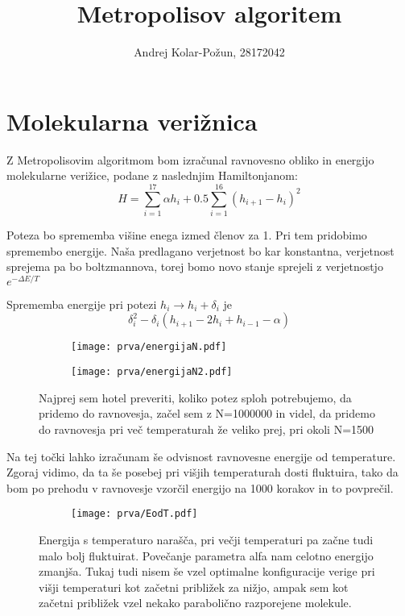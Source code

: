\documentclass{article}
\title{Metropolisov algoritem}
\author{Andrej Kolar-Požun, 28172042}
\begin{document}
\maketitle
\newpage
{}
\section{Molekularna verižnica}

Z Metropolisovim algoritmom bom izračunal ravnovesno obliko in energijo molekularne verižice, podane z naslednjim  Hamiltonjanom:
\begin{equation*}
H = \sum_{i=1}^{17}\alpha h_i + 0.5 \sum_{i=1}^{16} (h_{i+1} - h_{i})^2
\end{equation*}

Poteza bo sprememba višine enega izmed členov za 1. Pri tem pridobimo spremembo energije.
Naša predlagano verjetnost bo kar konstantna, verjetnost sprejema pa bo boltzmannova, torej bomo novo stanje sprejeli z verjetnostjo
$e^{-\Delta E/T}$

Sprememba energije pri potezi  $h_i \rightarrow h_i + \delta_i$ je
\begin{equation*}
\delta_i^2 - \delta_i (h_{i+1} - 2h_i + h_{i-1} - \alpha)
\end{equation*}

\begin{figure}[H]
\centering
\begin{subfigure}{.49\textwidth}
\texttt{[image: prva/energijaN.pdf]}
\end{subfigure}
\begin{subfigure}{.49\textwidth}
\texttt{[image: prva/energijaN2.pdf]}
\end{subfigure}
\caption*{Najprej sem hotel preveriti, koliko potez sploh potrebujemo, da pridemo do ravnovesja, začel sem z N=1000000 in videl, da pridemo do ravnovesja pri več temperaturah že veliko prej, pri okoli N=1500}
\end{figure}

Na tej točki lahko izračunam še odvisnost ravnovesne energije od temperature. Zgoraj vidimo, da ta še posebej pri višjih temperaturah dosti fluktuira, tako da bom po prehodu v ravnovesje vzorčil energijo na 1000 korakov in to povprečil.

\begin{figure}[H]
\centering
\begin{subfigure}{.7\textwidth}
\texttt{[image: prva/EodT.pdf]}
\end{subfigure}
\caption*{Energija s temperaturo narašča, pri večji temperaturi pa začne tudi malo bolj fluktuirat. Povečanje parametra alfa nam celotno energijo zmanjša. Tukaj tudi nisem še vzel optimalne konfiguracije verige pri višji temperaturi kot začetni približek za nižjo, ampak sem kot začetni približek vzel nekako parabolično razporejene molekule.}
\end{figure}
\end{document}
